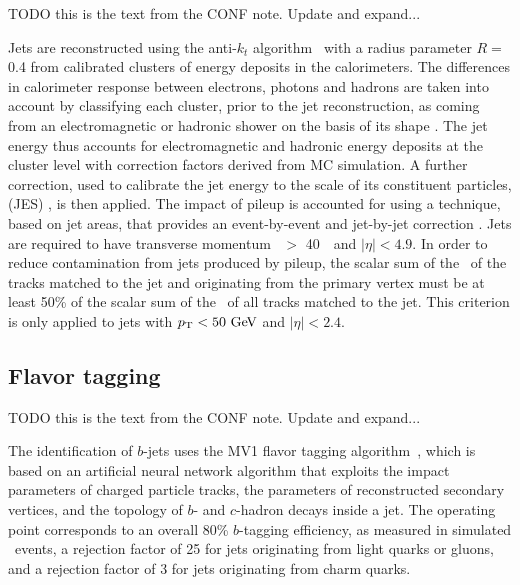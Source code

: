 {\color{red} TODO this is the text from the CONF note. Update and expand...}

Jets are reconstructed using the anti-$k_{t}$
algorithm~\cite{Cacciari:2008gp, Cacciari:2005hq} with a radius
parameter $R = $ 0.4 from calibrated clusters of energy deposits in
the calorimeters. The differences in calorimeter response between
electrons, photons and hadrons are taken into account by classifying
each cluster, prior to the jet reconstruction, as coming from an
electromagnetic or hadronic shower on the basis of its shape
\cite{JES}.  The jet energy thus accounts for electromagnetic
and hadronic energy deposits at the cluster level with correction
factors derived from MC simulation.  A further correction,
used to calibrate the jet energy to the scale of its constituent
particles, (JES) \cite{JES,JES2}, is then applied.  The impact of
pileup is accounted for using
a technique, based on jet areas, that provides an event-by-event and
jet-by-jet correction \cite{Cacciari:2007fd}.  Jets are required
to have transverse momentum \pt\ $>$ 40~\GeV\ and $|\eta| < 4.9$.
In order to reduce contamination from jets produced by pileup,
the scalar sum of the \pt\ of the tracks matched to the jet and
originating from the primary vertex must be at least 50\% of the
scalar sum of the \pt\ of all tracks matched to the jet.  This
criterion is only applied to jets with $\pt < 50 \GeV$ and $|\eta| < 2.4$.

\FloatBarrier
\subsection{Flavor tagging} 
\label{sec:flavor_tagging}

{\color{red} TODO this is the text from the CONF note. Update and expand...}

The identification of $b$-jets uses the MV1 flavor tagging
algorithm~\cite{ATLAS-CONF-2014-004, ATLAS-CONF-2014-046}, which is
based on an artificial neural network
algorithm that exploits the impact parameters of charged particle
tracks, the parameters of reconstructed secondary vertices, and the
topology of $b$- and $c$-hadron decays inside a jet.  The operating
point corresponds to an overall 80\% $b$-tagging efficiency, as
measured in simulated \TTBAR\ events, a rejection factor of 25 for jets
originating from light quarks or gluons, and a rejection factor of
3 for jets originating from charm quarks.

\FloatBarrier
